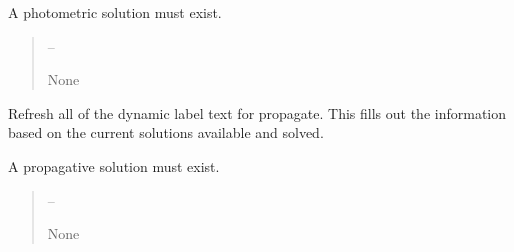 \documentclass[letterpaper,11pt,english]{sphinxmanual}
\begin{document}
\begin{savenotes}
\begin{fulllineitems}
\begin{savenotes}
\begin{fulllineitems}
\sphinxAtStartPar
A photometric solution must exist.
\begin{quote}\begin{description}
\sphinxAtStartPar
{} – 

\sphinxAtStartPar
None

\end{description}\end{quote}

\end{fulllineitems}\end{savenotes}


\begin{savenotes}\begin{fulllineitems}
\label{\detokenize{code/opihiexarata.gui.manual:opihiexarata.gui.manual.OpihiManualWindow.__refresh_dynamic_label_text_propagate}}
\pysigstartsignatures
{}
\pysigstopsignatures
\sphinxAtStartPar
Refresh all of the dynamic label text for propagate.
This fills out the information based on the current solutions
available and solved.

\sphinxAtStartPar
A propagative solution must exist.
\begin{quote}\begin{description}
\sphinxAtStartPar
{} – 

\sphinxAtStartPar
None

\end{description}\end{quote}

\end{fulllineitems}\end{savenotes}



\end{fulllineitems}
\end{savenotes}
\end{document}
